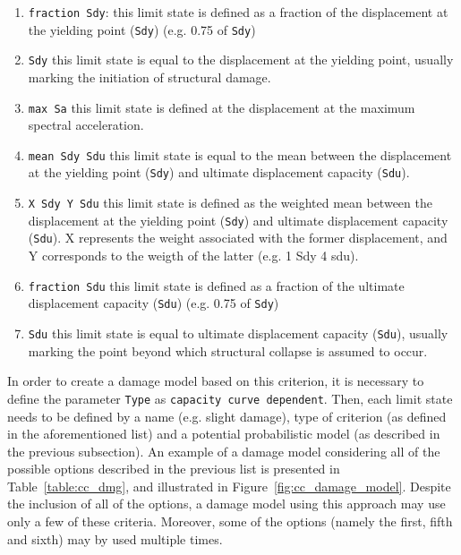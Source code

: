 \begin{enumerate}
 \item \verb=fraction Sdy=: this limit state is defined as a fraction of the displacement at the yielding point (\verb=Sdy=) (e.g. 0.75 of \verb=Sdy=)
 \item \verb=Sdy= this limit state is equal to the displacement at the yielding point, usually marking the initiation of structural damage.
 \item \verb=max Sa= this limit state is defined at the displacement at the maximum spectral acceleration.
 \item \verb=mean Sdy Sdu= this limit state is equal to the mean between the displacement at the yielding point (\verb=Sdy=) and ultimate displacement capacity (\verb=Sdu=).
 \item \verb=X Sdy Y Sdu= this limit state is defined as the weighted mean between the displacement at the yielding point (\verb=Sdy=) and ultimate displacement capacity (\verb=Sdu=). X represents the weight associated with the former displacement, and Y corresponds to the weigth of the latter (e.g. 1 Sdy 4 sdu).
 \item \verb=fraction Sdu= this limit state is defined as a fraction of the ultimate displacement capacity (\verb=Sdu=) (e.g. 0.75 of \verb=Sdy=)
 \item \verb=Sdu= this limit state is equal to ultimate displacement capacity (\verb=Sdu=), usually marking the point beyond which structural collapse is assumed to occur.\\
\end{enumerate}

In order to create a damage model based on this criterion, it is necessary to define the parameter \verb=Type= as \verb=capacity curve dependent=. Then, each limit state needs to be defined by a name (e.g. slight damage), type of criterion (as defined in the aforementioned list) and a potential probabilistic model (as described in the previous subsection). An example of a damage model considering all of the possible options described in the previous list is presented in Table~\ref{table:cc_dmg}, and illustrated in Figure~\ref{fig:cc_damage_model}. Despite the inclusion of all of the options, a damage model using this approach may use only a few of these criteria. Moreover, some of the options (namely the first, fifth and sixth) may by used multiple times.

